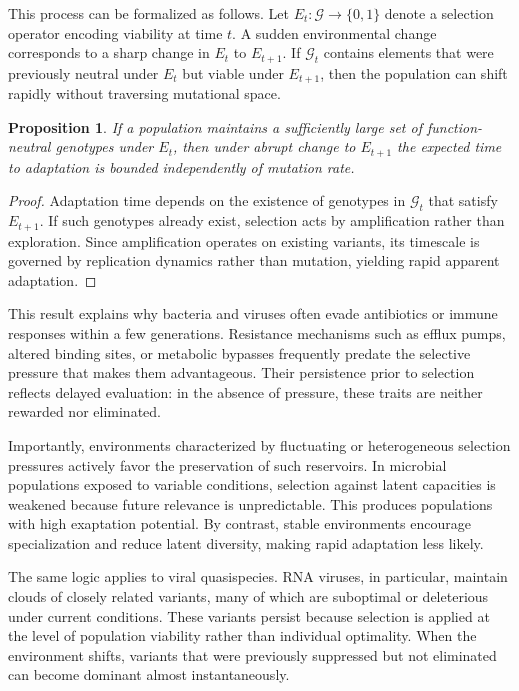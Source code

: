 \documentclass[11pt]{article}
\newtheorem{proposition}{Proposition}
\theoremstyle{definition}
\begin{document}
This process can be formalized as follows. Let $E_t:\mathcal{G}\to\{0,1\}$ denote a selection operator encoding viability at time $t$. A sudden environmental change corresponds to a sharp change in $E_t$ to $E_{t+1}$. If $\mathcal{G}_t$ contains elements that were previously neutral under $E_t$ but viable under $E_{t+1}$, then the population can shift rapidly without traversing mutational space.

\begin{proposition}
If a population maintains a sufficiently large set of function-neutral genotypes under $E_t$, then under abrupt change to $E_{t+1}$ the expected time to adaptation is bounded independently of mutation rate.
\end{proposition}

\begin{proof}
Adaptation time depends on the existence of genotypes in $\mathcal{G}_t$ that satisfy $E_{t+1}$. If such genotypes already exist, selection acts by amplification rather than exploration. Since amplification operates on existing variants, its timescale is governed by replication dynamics rather than mutation, yielding rapid apparent adaptation.
\end{proof}

This result explains why bacteria and viruses often evade antibiotics or immune responses within a few generations. Resistance mechanisms such as efflux pumps, altered binding sites, or metabolic bypasses frequently predate the selective pressure that makes them advantageous. Their persistence prior to selection reflects delayed evaluation: in the absence of pressure, these traits are neither rewarded nor eliminated.

Importantly, environments characterized by fluctuating or heterogeneous selection pressures actively favor the preservation of such reservoirs. In microbial populations exposed to variable conditions, selection against latent capacities is weakened because future relevance is unpredictable. This produces populations with high exaptation potential. By contrast, stable environments encourage specialization and reduce latent diversity, making rapid adaptation less likely.

The same logic applies to viral quasispecies. RNA viruses, in particular, maintain clouds of closely related variants, many of which are suboptimal or deleterious under current conditions. These variants persist because selection is applied at the level of population viability rather than individual optimality. When the environment shifts, variants that were previously suppressed but not eliminated can become dominant almost instantaneously.
\end{document}
